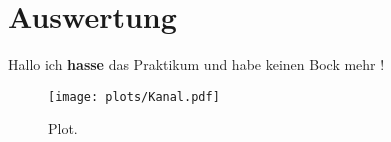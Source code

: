 \section{Auswertung}
Hallo ich \textbf{hasse} das Praktikum und habe keinen Bock mehr !


\begin{figure}
  \centering
  \texttt{[image: plots/Kanal.pdf]}
  \caption{Plot.}
  \label{fig:plot}
\end{figure}

